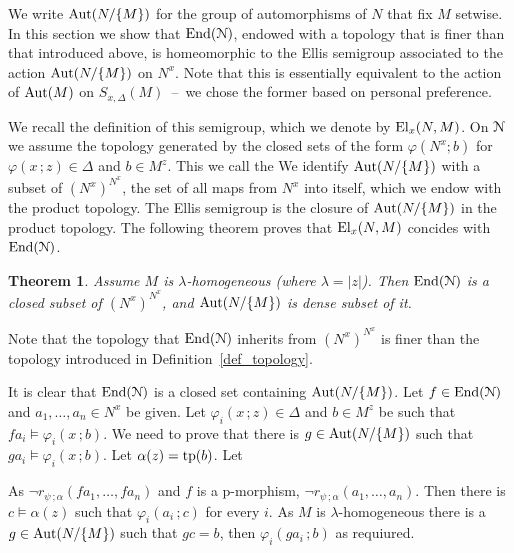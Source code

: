 \documentclass{amsproc}
\makeatletter
\def\U{\EuScript U}
\def\N{\EuScript N}
\def\phi{\varphi}
\newcounter{thm}
\theoremstyle{mio}
\newtheorem{theorem}[thm]{Theorem}\tcolorboxenvironment{theorem}{mythm}
\providecommand{\proofNameStyle}{\bfseries}
\renewenvironment{proof}[1][\proofname]{\par
  \pushQED{\qed}%
  \normalfont%
  \trivlist
  \item[\hskip\labelsep
        \proofNameStyle
    #1\@addpunct{.}]\ignorespaces
}{%
  \popQED\endtrivlist\@endpefalse
}
\renewcommand*{\emph}[1]{%
   \smash{\tikz[baseline]\node[rectangle, fill=teal!25, rounded corners, inner xsep=0.5ex, inner ysep=0.2ex, anchor=base, minimum height = 2.7ex]{\strut #1};}}
\makeatother
\begin{document}
We write ${\rm Aut}(N/\{M\})$ for the group of automorphisms of $N$ that fix $M$ setwise.
In this section we show that ${\rm End}(\N)$, endowed with a topology that is finer than that introduced above, is homeomorphic to the Ellis semigroup associated to the action %
${\rm Aut}(N/\{M\})$ on $N^x$.
Note that this is essentially equivalent to the action of ${\rm Aut}(M)$ on $S_{x,\Delta}(M)$~--~we chose the former based on personal preference.

We recall the definition of this semigroup, which we denote by ${\rm El}_x(N,M)$.
On $\N$ we assume the topology generated by the closed sets of the form $\phi(N^x;b)$ for $\phi(x\,;z)\in\Delta$ and $b\in M^z$\!.
This we call the \emph{logic topology.}
We identify ${\rm Aut}(N/\{M\})$ with a subset of $(N^x)^{N^x}$\!\!, the set of all maps from $N^x$ into itself, which we endow with the product topology.
The Ellis semigroup is the closure of ${\rm Aut}(N/\{M\})$ in the product topology.
The following theorem proves that ${\rm El}_x(N,M)$ concides with ${\rm End}(\N)$.

\begin{theorem}
  Assume $M$ is $\lambda$-homogeneous (where $\lambda=|z|$).
  Then ${\rm End}(\N)$ is a closed subset of $(N^x)^{N^x}$\!\!, and ${\rm Aut}(N/\{M\})$ is dense subset of it.
\end{theorem}

Note that the topology that ${\rm End}(\N)$ inherits from $(N^x)^{N^x}$\! is finer than the topology introduced in Definition~\ref{def_topology}.

\begin{proof}
  It is clear that ${\rm End}(\N)$ is a closed set containing ${\rm Aut}(N/\{M\})$.
  Let $f\in{\rm End}(\N)$ and $a_1,\dots,a_n\in N^x$ be given.
  Let $\phi_i(x\,;z)\in\Delta$ and $b\in M^z$ be such that $fa_i\models\phi_i(x\,;b)$.
  We need to prove that there is $g\in{\rm Aut}(N/\{M\})$ such that $ga_i\models\phi_i(x\,;b)$.
  Let $\alpha(z)={\rm tp}(b)$.
  Let

  \ceq{\hfill\psi(x_1,\dots,x_n\,;z)}{=}{\neg\bigwedge_{i=1}^n\phi_i(x_i\,;z)}

  As $\neg r_{\psi\,;\alpha}(fa_1,\dots,fa_n)$ and $f$ is a p-morphism, $\neg r_{\psi\,;\alpha}(a_1,\dots,a_n)$.
  Then there is $c\models\alpha(z)$ such that $\phi_i(a_i\,;c)$ for every $i$.
  As $M$ is $\lambda$-homogeneous there is a $g\in{\rm Aut}(N/\{M\})$ such that $gc=b$, then $\phi_i(ga_i\,;b)$ as requiured.
\end{proof}
\end{document}
